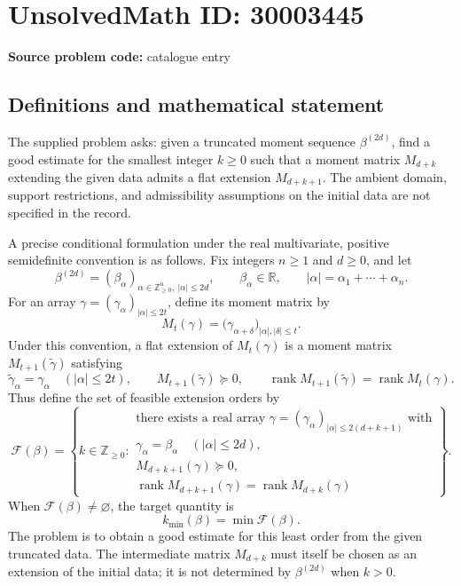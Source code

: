 \documentclass[11pt]{article}
\newcommand{\Z}{\mathbb{Z}}
\newcommand{\R}{\mathbb{R}}
\begin{document}
\section*{UnsolvedMath ID: 30003445}
\textbf{Source problem code:} catalogue entry
\subsection{Definitions and mathematical statement}
The supplied problem asks: given a truncated moment sequence \(\beta^{(2d)}\), find a good estimate for the smallest integer \(k\geq 0\) such that a moment matrix \(M_{d+k}\) extending the given data admits a flat extension \(M_{d+k+1}\). The ambient domain, support restrictions, and admissibility assumptions on the initial data are not specified in the record.

A precise conditional formulation under the real multivariate, positive semidefinite convention is as follows. Fix integers \(n\geq 1\) and \(d\geq 0\), and let
\[
\beta^{(2d)}=(\beta_\alpha)_{\alpha\in\Z_{\geq 0}^{n},\ |\alpha|\leq 2d},\qquad \beta_\alpha\in\R,\qquad |\alpha|=\alpha_1+\cdots+\alpha_n.
\]
For an array \(\gamma=(\gamma_\alpha)_{|\alpha|\leq 2t}\), define its moment matrix by
\[
M_t(\gamma)=\bigl(\gamma_{\alpha+\delta}\bigr)_{|\alpha|,|\delta|\leq t}.
\]
Under this convention, a flat extension of \(M_t(\gamma)\) is a moment matrix \(M_{t+1}(\widetilde\gamma)\) satisfying
\[
\widetilde\gamma_\alpha=\gamma_\alpha\quad(|\alpha|\leq 2t),\qquad
M_{t+1}(\widetilde\gamma)\succeq 0,\qquad
\operatorname{rank}M_{t+1}(\widetilde\gamma)=\operatorname{rank}M_t(\gamma).
\]
Thus define the set of feasible extension orders by
\[
\mathcal F(\beta)=\left\{k\in\Z_{\geq 0}:\begin{array}{l}
\text{there exists a real array }\gamma=(\gamma_\alpha)_{|\alpha|\leq 2(d+k+1)}\text{ with}\\
\gamma_\alpha=\beta_\alpha\quad(|\alpha|\leq 2d),\\
M_{d+k+1}(\gamma)\succeq 0,\\
\operatorname{rank}M_{d+k+1}(\gamma)=\operatorname{rank}M_{d+k}(\gamma)
\end{array}\right\}.
\]
When \(\mathcal F(\beta)\neq\varnothing\), the target quantity is
\[
k_{\min}(\beta)=\min\mathcal F(\beta).
\]
The problem is to obtain a good estimate for this least order from the given truncated data. The intermediate matrix \(M_{d+k}\) must itself be chosen as an extension of the initial data; it is not determined by \(\beta^{(2d)}\) when \(k>0\).
\end{document}

